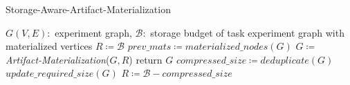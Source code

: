 \begin{algorithm}[h]
\caption{Storage-Aware-Artifact-Materialization}\label{algorithm-compression-aware-materialization}
\begin{algorithmic}[1]
\Require  $G(V,E):$ experiment graph, $\mathcal{B}:$ storage budget of task
\Ensure experiment graph with materialized vertices
\State $R \coloneqq  \mathcal{B}$ 
	\State $prev\_mats \coloneqq  materialized\_nodes(G)$
	\State $G \coloneqq $ \textit{Artifact-Materialization}($G, R$)
		\State return $G$
	\EndIf
	\State $compressed\_size \coloneqq  deduplicate(G)$
	\State $update\_required\_size(G)$
	\State  $R \coloneqq  \mathcal{B} -  compressed\_size$
\EndWhile
\end{algorithmic}
\end{algorithm}

